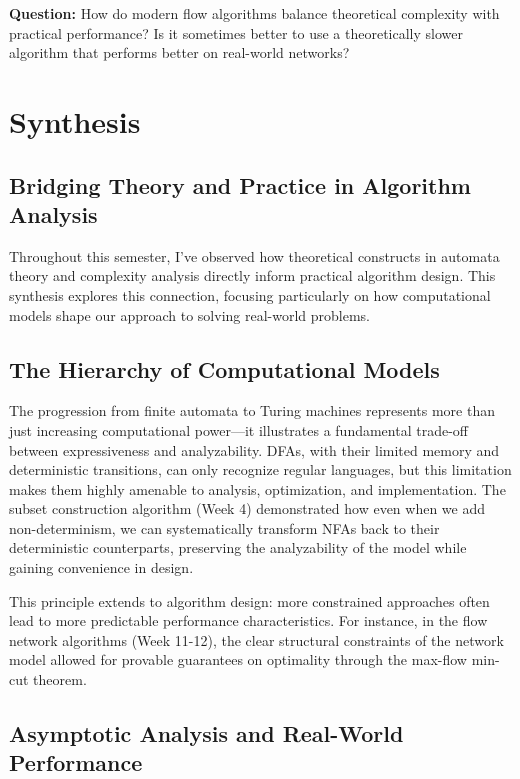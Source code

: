 \documentclass{article}
\theoremstyle{theorem}
\theoremstyle{definition}
\theoremstyle{remark}
\begin{document}
\textbf{Question:} How do modern flow algorithms balance theoretical complexity with practical performance? Is it sometimes better to use a theoretically slower algorithm that performs better on real-world networks?


\section{Synthesis}

\subsection{Bridging Theory and Practice in Algorithm Analysis}

Throughout this semester, I've observed how theoretical constructs in automata theory and complexity analysis directly inform practical algorithm design. This synthesis explores this connection, focusing particularly on how computational models shape our approach to solving real-world problems.

\subsection{The Hierarchy of Computational Models}

The progression from finite automata to Turing machines represents more than just increasing computational power—it illustrates a fundamental trade-off between expressiveness and analyzability. DFAs, with their limited memory and deterministic transitions, can only recognize regular languages, but this limitation makes them highly amenable to analysis, optimization, and implementation. The subset construction algorithm (Week 4) demonstrated how even when we add non-determinism, we can systematically transform NFAs back to their deterministic counterparts, preserving the analyzability of the model while gaining convenience in design.

This principle extends to algorithm design: more constrained approaches often lead to more predictable performance characteristics. For instance, in the flow network algorithms (Week 11-12), the clear structural constraints of the network model allowed for provable guarantees on optimality through the max-flow min-cut theorem.

\subsection{Asymptotic Analysis and Real-World Performance}
\end{document}
